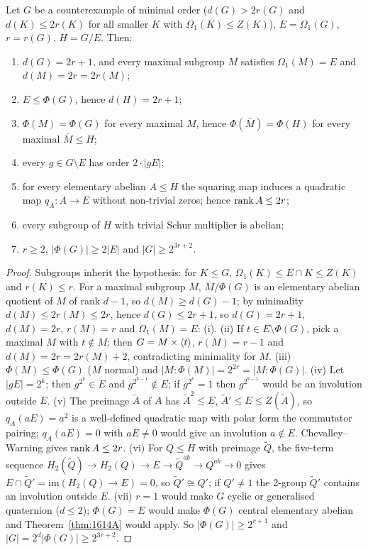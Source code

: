 \begin{theorem}\label{thm:1614B}
Let $G$ be a counterexample of minimal order ($d(G)>2r(G)$ and $d(K)\le 2r(K)$ for all smaller $K$ with
$\Omega_1(K)\le Z(K)$), $E=\Omega_1(G)$, $r=r(G)$, $H=G/E$. Then:
\begin{enumerate}[label=(\roman*)]
\item $d(G)=2r+1$, and every maximal subgroup $M$ satisfies $\Omega_1(M)=E$ and $d(M)=2r=2r(M)$;
\item $E\le\Phi(G)$, hence $d(H)=2r+1$;
\item $\Phi(M)=\Phi(G)$ for every maximal $M$, hence $\Phi(\bar M)=\Phi(H)$ for every maximal $\bar M\le H$;
\item every $g\in G\setminus E$ has order $2\cdot|gE|$;
\item for every elementary abelian $A\le H$ the squaring map induces a quadratic map $q_A:A\to E$ without
non-trivial zeros; hence $\operatorname{rank} A\le 2r$;
\item every subgroup of $H$ with trivial Schur multiplier is abelian;
\item $r\ge 2$, $|\Phi(G)|\ge 2|E|$ and $|G|\ge 2^{3r+2}$.
\end{enumerate}
\end{theorem}
\begin{proof}
Subgroups inherit the hypothesis: for $K\le G$, $\Omega_1(K)\le E\cap K\le Z(K)$ and $r(K)\le r$. For a maximal
subgroup $M$, $M/\Phi(G)$ is an elementary abelian quotient of $M$ of rank $d-1$, so $d(M)\ge d(G)-1$; by
minimality $d(M)\le 2r(M)\le 2r$, hence $d(G)\le 2r+1$, so $d(G)=2r+1$, $d(M)=2r$, $r(M)=r$ and $\Omega_1(M)=E$: (i).
(ii) If $t\in E\setminus\Phi(G)$, pick a maximal $M$ with $t\notin M$; then $G=M\times\langle t\rangle$, $r(M)=r-1$ and
$d(M)=2r=2r(M)+2$, contradicting minimality for $M$. (iii) $\Phi(M)\le\Phi(G)$ ($M$ normal) and
$|M:\Phi(M)|=2^{2r}=|M:\Phi(G)|$. (iv) Let $|gE|=2^k$; then $g^{2^k}\in E$ and $g^{2^{k-1}}\notin E$; if $g^{2^k}=1$
then $g^{2^{k-1}}$ would be an involution outside $E$. (v) The preimage $\tilde A$ of $A$ has $\tilde A^2\le E$,
$\tilde A'\le E\le Z(\tilde A)$, so $q_A(aE)=a^2$ is a well-defined quadratic map with polar form the commutator
pairing; $q_A(aE)=0$ with $aE\ne 0$ would give an involution $a\notin E$. Chevalley--Warning gives $\operatorname{rank} A\le 2r$.
(vi) For $Q\le H$ with preimage $\tilde Q$, the five-term sequence $H_2(\tilde Q)\to H_2(Q)\to E\to\tilde Q^{ab}\to
Q^{ab}\to 0$ gives $E\cap\tilde Q'=\mathrm{im}(H_2(Q)\to E)=0$, so $\tilde Q'\cong Q'$; if $Q'\ne 1$ the 2-group
$\tilde Q'$ contains an involution outside $E$. (vii) $r=1$ would make $G$ cyclic or generalised quaternion
($d\le 2$); $\Phi(G)=E$ would make $\Phi(G)$ central elementary abelian and Theorem~\ref{thm:1614A} would apply.
So $|\Phi(G)|\ge 2^{r+1}$ and $|G|=2^d|\Phi(G)|\ge 2^{3r+2}$.
\end{proof}

